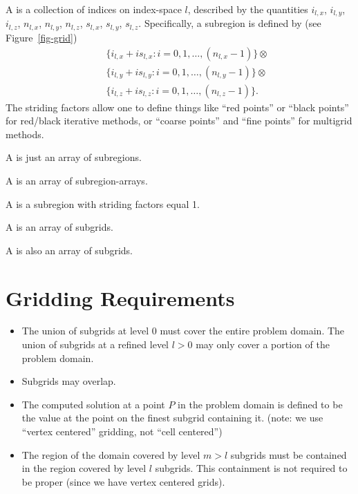 A  is a collection of indices on index-space
$l$, described by the quantities
$i_{l,x}$, $i_{l,y}$, $i_{l,z}$,
$n_{l,x}$, $n_{l,y}$, $n_{l,z}$,
$s_{l,x}$, $s_{l,y}$, $s_{l,z}$.
Specifically, a subregion is defined by
(see Figure~\ref{fig-grid})
\begin{eqnarray}
& & \{ i_{l,x} + i s_{l,x} : i = 0, 1, \ldots, (n_{l,x}-1) \} \otimes \\
& & \{ i_{l,y} + i s_{l,y} : i = 0, 1, \ldots, (n_{l,y}-1) \} \otimes \\
& & \{ i_{l,z} + i s_{l,z} : i = 0, 1, \ldots, (n_{l,z}-1) \} .
\end{eqnarray}
The striding factors allow one to define things
like ``red points'' or ``black points'' for red/black iterative methods,
or ``coarse points'' and ``fine points'' for multigrid methods.

A  is just an array of subregions.

A  is an array of subregion-arrays.

A  is a subregion with striding factors equal 1.

A  is an array of subgrids.

A  is also an array of subgrids.


\section{Gridding Requirements}
\label{Gridding Requirements}

\begin{itemize}

\item
The union of subgrids at level 0 must cover the entire problem domain.
The union of subgrids at a refined level $l > 0$
may only cover a portion of the problem domain.
 
\item
Subgrids may overlap.
 
\item
The computed solution at a point $P$
in the problem domain
is defined to be the value at the point on the finest subgrid containing it.
(note: we use ``vertex centered'' gridding, not ``cell centered'')

\item
The region of the domain covered by level $m > l$ subgrids
must be contained in the region covered by level $l$ subgrids.
This containment is not required to be proper (since we have vertex
centered grids).
 
\end{itemize}

